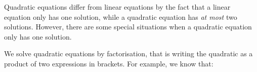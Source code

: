       
      \label{m39247*id149478}Quadratic equations differ from linear equations by the fact that a linear
equation only has one solution, while a quadratic equation has \textsl{at most}
two solutions. However, there are some special situations when a quadratic equation only
has one solution.\par 
      \label{m39247*id149489}We solve quadratic equations by factorisation, that is writing the quadratic as
a product of two expressions in brackets. For example, we know that:\par 
      \label{m39247*id149493}\nopagebreak\noindent{}
    
